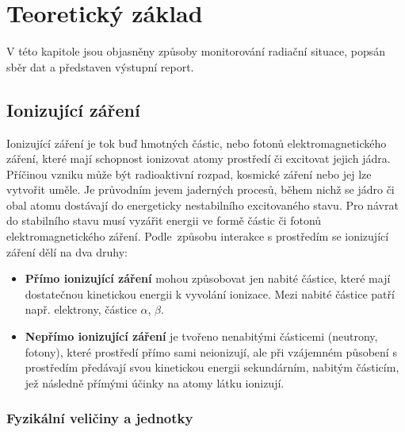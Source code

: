 \chapter{Teoretický základ}
\label{2-teorie}

V této kapitole jsou objasněny způsoby monitorování radiační situace,
popsán sběr dat a představen výstupní report.

\section{Ionizující záření}

Ionizující záření je tok buď hmotných částic, nebo fotonů
elektromagnetického záření, které mají schopnost ionizovat atomy
prostředí či excitovat jejich jádra. Příčinou vzniku může být
radioaktivní rozpad, kosmické záření nebo jej lze vytvořit uměle. Je
průvodním jevem jaderných procesů, během nichž se jádro či obal atomu
dostávají do energeticky nestabilního excitovaného stavu. Pro návrat
do stabilního stavu musí vyzářit energii ve formě částic či fotonů
elektromagnetického záření. Podle~způsobu interakce s prostředím se
ionizující záření dělí na dva druhy:

\begin{itemize}
\item \textbf{Přímo ionizující záření} mohou způsobovat jen nabité
  částice, které mají dosta\-tečnou kinetickou energii k vyvolání
  ionizace. Mezi nabité částice patří např. elektrony, částice
  $\alpha$, $\beta$.
	
\item \textbf{Nepřímo ionizující záření} je tvořeno nenabitými
  částicemi (neutrony, fotony), které prostředí přímo sami neionizují,
  ale při vzájemném působení s prostředím předávají svou kinetickou
  energii sekundárním, nabitým částicím, jež následně přímými účinky
  na atomy látku ionizují.
\end{itemize}


\subsection{Fyzikální veličiny a jednotky}

